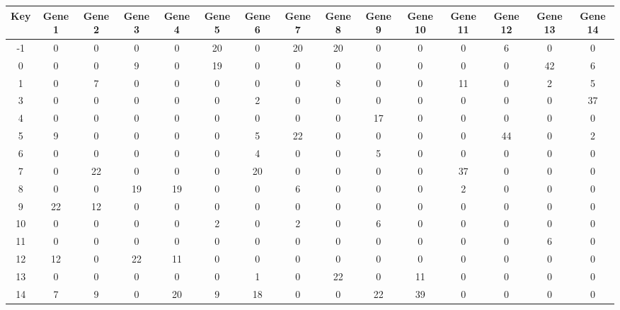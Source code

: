 \begin{tabular}{|c|c|c|c|c|c|c|c|c|c|c|c|c|c|c|}
\hline
Key & Gene 1 & Gene 2 & Gene 3 & Gene 4 & Gene 5 & Gene 6 & Gene 7 & Gene 8 & Gene 9 & Gene 10 & Gene 11 & Gene 12 & Gene 13 & Gene 14 \\
\hline
-1 & 0 & 0 & 0 & 0 & 20 & 0 & 20 & 20 & 0 & 0 & 0 & 6 & 0 & 0 \\
0 & 0 & 0 & 9 & 0 & 19 & 0 & 0 & 0 & 0 & 0 & 0 & 0 & 42 & 6 \\
1 & 0 & 7 & 0 & 0 & 0 & 0 & 0 & 8 & 0 & 0 & 11 & 0 & 2 & 5 \\
3 & 0 & 0 & 0 & 0 & 0 & 2 & 0 & 0 & 0 & 0 & 0 & 0 & 0 & 37 \\
4 & 0 & 0 & 0 & 0 & 0 & 0 & 0 & 0 & 17 & 0 & 0 & 0 & 0 & 0 \\
5 & 9 & 0 & 0 & 0 & 0 & 5 & 22 & 0 & 0 & 0 & 0 & 44 & 0 & 2 \\
6 & 0 & 0 & 0 & 0 & 0 & 4 & 0 & 0 & 5 & 0 & 0 & 0 & 0 & 0 \\
7 & 0 & 22 & 0 & 0 & 0 & 20 & 0 & 0 & 0 & 0 & 37 & 0 & 0 & 0 \\
8 & 0 & 0 & 19 & 19 & 0 & 0 & 6 & 0 & 0 & 0 & 2 & 0 & 0 & 0 \\
9 & 22 & 12 & 0 & 0 & 0 & 0 & 0 & 0 & 0 & 0 & 0 & 0 & 0 & 0 \\
10 & 0 & 0 & 0 & 0 & 2 & 0 & 2 & 0 & 6 & 0 & 0 & 0 & 0 & 0 \\
11 & 0 & 0 & 0 & 0 & 0 & 0 & 0 & 0 & 0 & 0 & 0 & 0 & 6 & 0 \\
12 & 12 & 0 & 22 & 11 & 0 & 0 & 0 & 0 & 0 & 0 & 0 & 0 & 0 & 0 \\
13 & 0 & 0 & 0 & 0 & 0 & 1 & 0 & 22 & 0 & 11 & 0 & 0 & 0 & 0 \\
14 & 7 & 9 & 0 & 20 & 9 & 18 & 0 & 0 & 22 & 39 & 0 & 0 & 0 & 0 \\
\hline
\end{tabular}